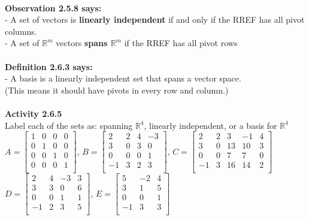 \documentclass{article}
\begin{document}
{\\
\textbf{Observation 2.5.8 says:}\\
- A set of vectors is \textbf{linearly independent} if and only if the RREF has all pivot columns.\\
- A set of $\mathbb{R}^{m}$ vectors \textbf{spans $\mathbb{R}^{m}$} if the RREF has all pivot rows\\
\\
\textbf{Definition 2.6.3 says:}\\
- A basis is a linearly independent set that spans a vector space. \\
(This means it should have pivots in every row and column.)\\
\\
\textbf{Activity 2.6.5}\\
Label each of the sets as: spanning $\mathbb{R}^{4}$, linearly independent, or a basis for $\mathbb{R}^{4}$
\\
$
A = \begin{bmatrix} 
1 & 0 & 0 & 0 \\ 
0 & 1 & 0 & 0 \\
0 & 0 & 1 & 0 \\
0 & 0 & 0 & 1 \\
\end{bmatrix}
$, $
B = \begin{bmatrix} 
2 & 2 & 4 & -3 \\ 
3 & 0 & 3 & 0 \\
0 & 0 & 0 & 1 \\
-1 & 3 & 2 & 3 \\
\end{bmatrix}
$, $
C = \begin{bmatrix} 
2 & 2 & 3 & -1 & 4 \\ 
3 & 0 & 13 & 10 & 3 \\ 
0 & 0 & 7 & 7 & 0 \\ 
-1 & 3 & 16 & 14 & 2 \\ 
\end{bmatrix}
$\\$D = \begin{bmatrix} 
2 & 4 & -3 & 3 \\ 
3 & 3 & 0 & 6 \\
0 & 0 & 1 & 1 \\
-1 & 2 & 3 & 5 \\
\end{bmatrix}
$, $E = \begin{bmatrix} 
5 & -2 & 4\\ 
3 & 1 & 5\\
0 & 0 & 1\\
-1 & 3 & 3\\
\end{bmatrix}
$\\
\\

}
\end{document}
